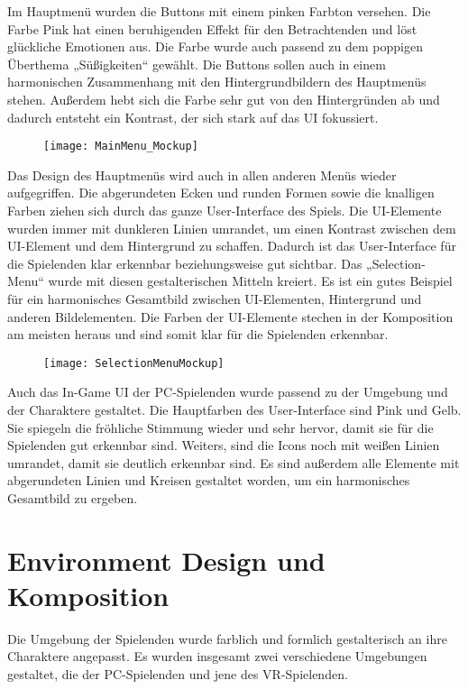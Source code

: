 Im Hauptmenü wurden die Buttons mit einem pinken Farbton versehen. Die Farbe Pink hat einen beruhigenden Effekt für den Betrachtenden und löst glückliche Emotionen aus. Die Farbe wurde auch passend zu dem poppigen Überthema „Süßigkeiten“ gewählt. Die Buttons sollen auch in einem harmonischen Zusammenhang mit den Hintergrundbildern des Hauptmenüs stehen. Außerdem hebt sich die Farbe sehr gut von den Hintergründen ab und dadurch entsteht ein Kontrast, der sich stark auf das UI fokussiert. 

\begin{figure}[H]
	\centering
	\texttt{[image: MainMenu\_Mockup]}
\end{figure}

Das Design des Hauptmenüs wird auch in allen anderen Menüs wieder aufgegriffen. Die abgerundeten Ecken und runden Formen sowie die knalligen Farben ziehen sich durch das ganze User-Interface des Spiels. Die UI-Elemente wurden immer mit dunkleren Linien umrandet, um einen Kontrast zwischen dem UI-Element und dem Hintergrund zu schaffen. Dadurch ist das User-Interface für die Spielenden klar erkennbar beziehungsweise gut sichtbar. Das „Selection-Menu“ wurde mit diesen gestalterischen Mitteln kreiert. Es ist ein gutes Beispiel für ein harmonisches Gesamtbild zwischen UI-Elementen, Hintergrund und anderen Bildelementen. Die Farben der UI-Elemente stechen in der Komposition am meisten heraus und sind somit klar für die Spielenden erkennbar.

\begin{figure}[H]
	\centering
	\texttt{[image: SelectionMenuMockup]}
\end{figure}

Auch das In-Game UI der PC-Spielenden wurde passend zu der Umgebung und der Charaktere gestaltet. Die Hauptfarben des User-Interface sind Pink und Gelb. Sie spiegeln die fröhliche Stimmung wieder und sehr hervor, damit sie für die Spielenden gut erkennbar sind. Weiters, sind die Icons noch mit weißen Linien umrandet, damit sie deutlich erkennbar sind. Es sind außerdem alle Elemente mit abgerundeten Linien und Kreisen gestaltet worden, um ein harmonisches Gesamtbild zu ergeben.

\section{Environment Design und Komposition}
Die Umgebung der Spielenden wurde farblich und formlich gestalterisch an ihre Charaktere angepasst. Es wurden insgesamt zwei verschiedene Umgebungen gestaltet, die der PC-Spielenden und jene des VR-Spielenden. 

